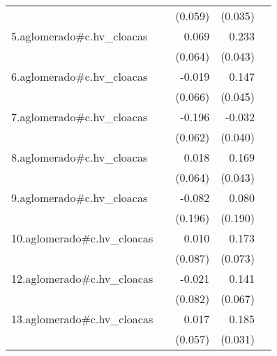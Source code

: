 {\begin{longtable}{l*{4}{D{.}{.}{-1}}}
            &                     &     (0.059)         &     (0.035)         &                     \\
\addlinespace
5.aglomerado#c.hv\_cloacas&                     &       0.069         &       0.233\sym{***}&                     \\
            &                     &     (0.064)         &     (0.043)         &                     \\
\addlinespace
6.aglomerado#c.hv\_cloacas&                     &      -0.019         &       0.147\sym{**} &                     \\
            &                     &     (0.066)         &     (0.045)         &                     \\
\addlinespace
7.aglomerado#c.hv\_cloacas&                     &      -0.196\sym{**} &      -0.032         &                     \\
            &                     &     (0.062)         &     (0.040)         &                     \\
\addlinespace
8.aglomerado#c.hv\_cloacas&                     &       0.018         &       0.169\sym{***}&                     \\
            &                     &     (0.064)         &     (0.043)         &                     \\
\addlinespace
9.aglomerado#c.hv\_cloacas&                     &      -0.082         &       0.080         &                     \\
            &                     &     (0.196)         &     (0.190)         &                     \\
\addlinespace
10.aglomerado#c.hv\_cloacas&                     &       0.010         &       0.173\sym{*}  &                     \\
            &                     &     (0.087)         &     (0.073)         &                     \\
\addlinespace
12.aglomerado#c.hv\_cloacas&                     &      -0.021         &       0.141\sym{*}  &                     \\
            &                     &     (0.082)         &     (0.067)         &                     \\
\addlinespace
13.aglomerado#c.hv\_cloacas&                     &       0.017         &       0.185\sym{***}&                     \\
            &                     &     (0.057)         &     (0.031)         &                     \\

\end{longtable}}
